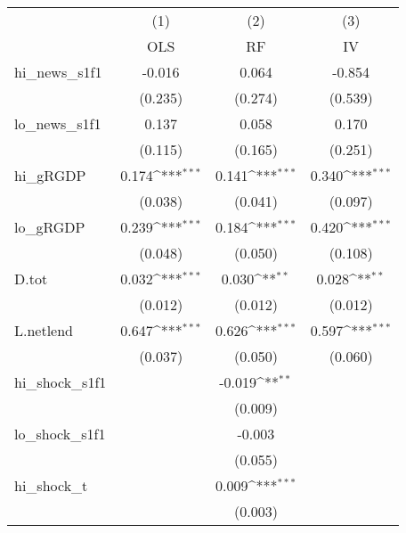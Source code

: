 {
\def\sym#1{\ifmmode^{#1}\else\(^{#1}\)\fi}
\begin{tabular}{l*{3}{c}}
\toprule
            &\multicolumn{1}{c}{(1)}&\multicolumn{1}{c}{(2)}&\multicolumn{1}{c}{(3)}\\
            &\multicolumn{1}{c}{OLS}&\multicolumn{1}{c}{RF}&\multicolumn{1}{c}{IV}\\
\midrule
hi\_news\_s1f1&      -0.016         &       0.064         &      -0.854         \\
            &     (0.235)         &     (0.274)         &     (0.539)         \\
\addlinespace
lo\_news\_s1f1&       0.137         &       0.058         &       0.170         \\
            &     (0.115)         &     (0.165)         &     (0.251)         \\
\addlinespace
hi\_gRGDP    &       0.174\sym{***}&       0.141\sym{***}&       0.340\sym{***}\\
            &     (0.038)         &     (0.041)         &     (0.097)         \\
\addlinespace
lo\_gRGDP    &       0.239\sym{***}&       0.184\sym{***}&       0.420\sym{***}\\
            &     (0.048)         &     (0.050)         &     (0.108)         \\
\addlinespace
D.tot       &       0.032\sym{***}&       0.030\sym{**} &       0.028\sym{**} \\
            &     (0.012)         &     (0.012)         &     (0.012)         \\
\addlinespace
L.netlend   &       0.647\sym{***}&       0.626\sym{***}&       0.597\sym{***}\\
            &     (0.037)         &     (0.050)         &     (0.060)         \\
\addlinespace
hi\_shock\_s1f1&                     &      -0.019\sym{**} &                     \\
            &                     &     (0.009)         &                     \\
\addlinespace
lo\_shock\_s1f1&                     &      -0.003         &                     \\
            &                     &     (0.055)         &                     \\
\addlinespace
hi\_shock\_t  &                     &       0.009\sym{***}&                     \\
            &                     &     (0.003)         &                     \\

\end{tabular}}
